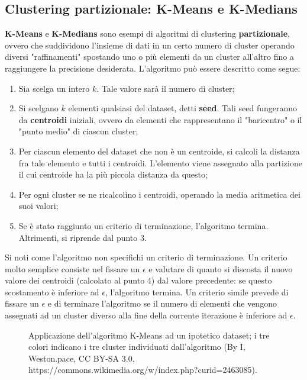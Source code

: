 \documentclass[a4paper, 12pt]{report}
\begin{document}
			\subsection{Clustering partizionale: K-Means e K-Medians}

				\textbf{K-Means} e \textbf{K-Medians} sono esempi di algoritmi
				di clustering \textbf{partizionale}, ovvero che suddividono
				l'insieme di dati in un certo numero di cluster operando diversi
				"raffinamenti" spostando uno o più elementi da un cluster all'altro
				fino a raggiungere la precisione desiderata. L'algoritmo può essere
				descritto come segue:

				\begin{enumerate}
					\item
						Sia scelga un intero $k$. Tale valore sarà il numero di cluster;
					\item
						Si scelgano $k$ elementi qualsiasi del dataset, detti \textbf{seed}.
						Tali seed fungeranno da \textbf{centroidi} iniziali, ovvero da elementi
						che rappresentano il "baricentro" o il "punto medio" di ciascun cluster;
					\item
						Per ciascun elemento del dataset che non è un centroide, si calcoli
						la distanza fra tale elemento e tutti i centroidi. L'elemento viene
						assegnato alla partizione il cui centroide ha la più piccola distanza
						da questo;
					\item
						Per ogni cluster se ne ricalcolino i centroidi, operando la media
						aritmetica dei suoi valori;
					\item
						Se è stato raggiunto un criterio di terminazione, l'algoritmo termina.
						Altrimenti, si riprende dal punto 3.
				\end{enumerate}

				Si noti come l'algoritmo non specifichi un criterio di terminazione. Un criterio
				molto semplice consiste nel fissare un $\epsilon$ e valutare di quanto
				si discosta il nuovo valore dei centroidi (calcolato al punto 4) dal
				valore precedente: se questo scostamento è inferiore ad $\epsilon$,
				l'algoritmo termina. Un criterio simile prevede di fissare un $\epsilon$
				e di terminare l'algoritmo se il numero di elementi che vengono assegnati
				ad un cluster diverso alla fine della corrente iterazione è inferiore ad
				$\epsilon$.

				\begin{figure}[H]
					\centering
					
					\caption{Applicazione dell'algoritmo K-Means ad un ipotetico dataset;
					i tre colori indicano i tre cluster individuati dall'algoritmo (By I,
					Weston.pace, CC BY-SA 3.0, https://commons.wikimedia.org/w/index.php?curid=2463085).}
					\label{fig:k-means-example}
				\end{figure}
\end{document}

